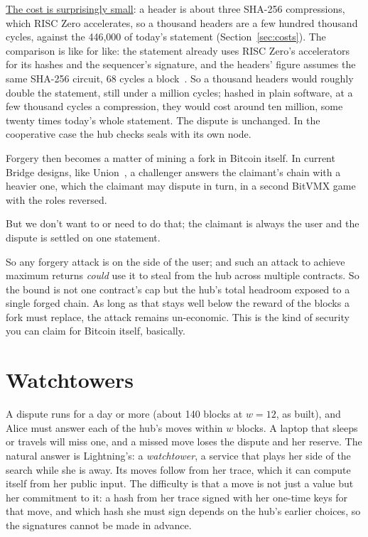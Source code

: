 \documentclass[11pt]{article}
\begin{document}
\underline{The cost is surprisingly small}: a header is about three SHA-256 compressions, which RISC Zero accelerates, so a thousand headers are a few hundred thousand cycles, against the
446,000 of today's statement (Section~\ref{sec:costs}). The comparison
is like for like: the statement already uses RISC Zero's accelerators
for its hashes and the sequencer's signature, and the headers' figure
assumes the same SHA-256 circuit, 68 cycles a block~\cite{risc0accel}.
So a thousand headers would roughly double the statement, still
under a million cycles; hashed in plain software, at a few thousand
cycles a compression, they would cost around ten million, some twenty
times today's whole statement. The dispute is unchanged. In the cooperative case the hub checks seals with its own node.

Forgery then becomes a matter of mining a fork in Bitcoin itself. In current Bridge designs, like Union~\cite{union}, a challenger answers the claimant's chain with a
heavier one, which the claimant may dispute in turn, in a second BitVMX
game with the roles reversed.

But we don't want to or need to do that; the claimant is always the user and the dispute is settled on one statement.

So any forgery attack is on the side of the user; and such an attack to achieve maximum returns \emph{could} use it to steal from the hub across multiple contracts.
So the bound is not one contract's cap but
the hub's total headroom exposed to a single forged chain. As long as
that stays well below the reward of the blocks a fork must replace, the attack remains un-economic. This is the kind of security you can claim for Bitcoin itself, basically.

\section{Watchtowers}
\label{sec:watch}

A dispute runs for a day or more (about 140 blocks at $w = 12$, as built), and Alice must
answer each of the hub's moves within $w$ blocks. A laptop that sleeps
or travels will miss one, and a missed move loses the dispute and her
reserve. The natural answer is Lightning's: a \emph{watchtower}, a
service that plays her side of the search while she is away. Its moves
follow from her trace, which it can compute itself from her public
input. The difficulty is that a move is not just a value but her
commitment to it: a hash from her trace signed with her one-time keys
for that move, and which hash she must sign depends on the hub's earlier
choices, so the signatures cannot be made in advance.
\end{document}
